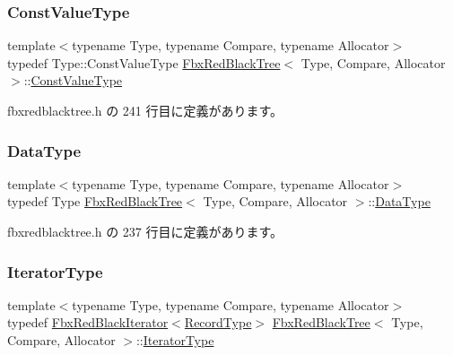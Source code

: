 \subsubsection{\texorpdfstring{Const\+Value\+Type}{ConstValueType}}
{\footnotesize\ttfamily template$<$typename Type, typename Compare, typename Allocator$>$ \\
typedef Type\+::\+Const\+Value\+Type \hyperlink{class_fbx_red_black_tree}{Fbx\+Red\+Black\+Tree}$<$ Type, Compare, Allocator $>$\+::\hyperlink{class_fbx_red_black_tree_a60ce913af196ee4cf886585363c4b0ca}{Const\+Value\+Type}}



 fbxredblacktree.\+h の 241 行目に定義があります。

\mbox{\label{class_fbx_red_black_tree_a9bd3feb4c82e7d105bc475f01a9a199d}} 
\subsubsection{\texorpdfstring{Data\+Type}{DataType}}
{\footnotesize\ttfamily template$<$typename Type, typename Compare, typename Allocator$>$ \\
typedef Type \hyperlink{class_fbx_red_black_tree}{Fbx\+Red\+Black\+Tree}$<$ Type, Compare, Allocator $>$\+::\hyperlink{class_fbx_red_black_tree_a9bd3feb4c82e7d105bc475f01a9a199d}{Data\+Type}}



 fbxredblacktree.\+h の 237 行目に定義があります。

\mbox{\label{class_fbx_red_black_tree_af7b6209131012ec5aa33e0286c956cd6}} 
\subsubsection{\texorpdfstring{Iterator\+Type}{IteratorType}}
{\footnotesize\ttfamily template$<$typename Type, typename Compare, typename Allocator$>$ \\
typedef \hyperlink{class_fbx_red_black_iterator}{Fbx\+Red\+Black\+Iterator}$<$\hyperlink{class_fbx_red_black_tree_1_1_record_type}{Record\+Type}$>$ \hyperlink{class_fbx_red_black_tree}{Fbx\+Red\+Black\+Tree}$<$ Type, Compare, Allocator $>$\+::\hyperlink{class_fbx_red_black_tree_af7b6209131012ec5aa33e0286c956cd6}{Iterator\+Type}}




